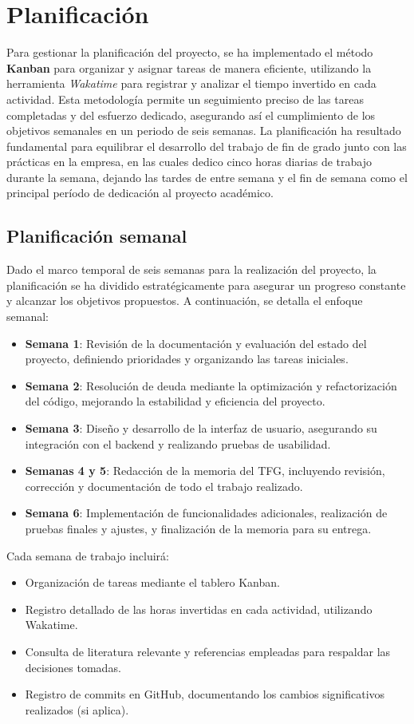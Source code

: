 \chapter{Planificación} \label{planificacion}
Para gestionar la planificación del proyecto, se ha implementado el método \textbf{Kanban} para organizar y asignar tareas de manera eficiente, utilizando la herramienta \textit{Wakatime} para registrar y analizar el tiempo invertido en cada actividad. Esta metodología permite un seguimiento preciso de las tareas completadas y del esfuerzo dedicado, asegurando así el cumplimiento de los objetivos semanales en un periodo de seis semanas. La planificación ha resultado fundamental para equilibrar el desarrollo del trabajo de fin de grado junto con las prácticas en la empresa, en las cuales dedico cinco horas diarias de trabajo durante la semana, dejando las tardes de entre semana y el fin de semana como el principal período de dedicación al proyecto académico.

\section{Planificación semanal}
Dado el marco temporal de seis semanas para la realización del proyecto, la planificación se ha dividido estratégicamente para asegurar un progreso constante y alcanzar los objetivos propuestos. A continuación, se detalla el enfoque semanal:

\begin{itemize}
    \item \textbf{Semana 1}: Revisión de la documentación y evaluación del estado del proyecto, definiendo prioridades y organizando las tareas iniciales.
    \item \textbf{Semana 2}: Resolución de \Gls{deuda} mediante la optimización y refactorización del código, mejorando la estabilidad y eficiencia del proyecto.
    \item \textbf{Semana 3}: Diseño y desarrollo de la interfaz de usuario, asegurando su integración con el backend y realizando pruebas de usabilidad.
    \item \textbf{Semanas 4 y 5}: Redacción de la memoria del TFG, incluyendo revisión, corrección y documentación de todo el trabajo realizado.
    \item \textbf{Semana 6}: Implementación de funcionalidades adicionales, realización de pruebas finales y ajustes, y finalización de la memoria para su entrega.
\end{itemize}
Cada semana de trabajo incluirá:
\begin{itemize}
    \item Organización de tareas mediante el tablero Kanban.
    \item Registro detallado de las horas invertidas en cada actividad, utilizando Wakatime.
    \item Consulta de literatura relevante y referencias empleadas para respaldar las decisiones tomadas.
    \item Registro de commits en GitHub, documentando los cambios significativos realizados (si aplica).
\end{itemize}

